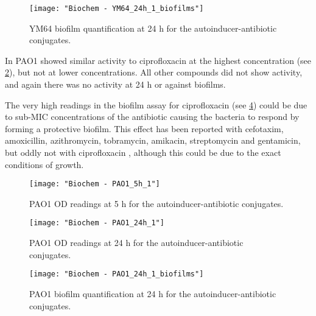 \begin{figure}[H]
	\begin{center}
		\texttt{[image: "Biochem - YM64\_24h\_1\_biofilms"]}
		\caption{YM64 biofilm quantification at 24 h for the autoinducer-antibiotic conjugates.\label{fgr:YM64_biofilms}}
	\end{center}
\end{figure}


In PAO1  showed similar activity to ciprofloxacin  at the highest concentration (see \ref{fgr:PAO1_5h}), but not at lower concentrations. All other compounds did not show activity, and again there was no activity at 24 h or against biofilms. 

The very high readings in the biofilm assay for ciprofloxacin  (see \ref{fgr:PAO1_biofilms}) could be due to sub-MIC concentrations of the antibiotic causing the bacteria to respond by forming a protective biofilm. This effect has been reported with cefotaxim, amoxicillin, azithromycin\cite{Aka2015,Hoffman2005}, tobramycin, amikacin, streptomycin and gentamicin, but oddly not with ciprofloxacin \cite{Gupta2016,Machado2013}, although this could be due to the exact conditions of growth.

\begin{figure}[H]
	\begin{center}
		\texttt{[image: "Biochem - PAO1\_5h\_1"]}
		\caption{PAO1 OD readings at 5 h for the autoinducer-antibiotic conjugates.\label{fgr:PAO1_5h}}
	\end{center}
\end{figure}

\begin{figure}[H]
	\begin{center}
		\texttt{[image: "Biochem - PAO1\_24h\_1"]}
		\caption{PAO1 OD readings at 24 h for the autoinducer-antibiotic conjugates.\label{fgr:PAO1_24h}}
	\end{center}
\end{figure}

\begin{figure}[H]
	\begin{center}
		\texttt{[image: "Biochem - PAO1\_24h\_1\_biofilms"]}
		\caption{PAO1 biofilm quantification at 24 h for the autoinducer-antibiotic conjugates.\label{fgr:PAO1_biofilms}}
	\end{center}
\end{figure}

